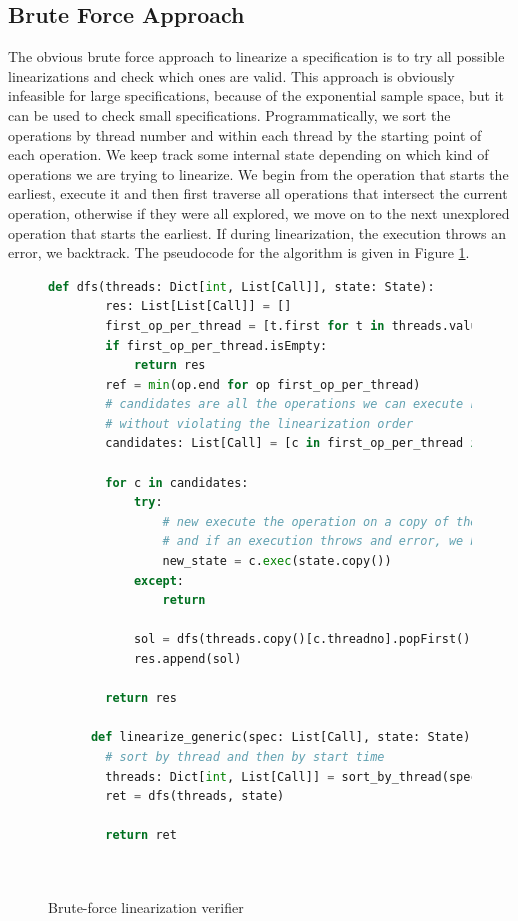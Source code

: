 \documentclass[oneside, a4paper, onecolumn, 10pt]{article}
\begin{document}
\subsection{Brute Force Approach}
The obvious brute force approach to linearize a specification is to try all possible linearizations and check which ones are valid. This approach is obviously infeasible for large specifications, because of the exponential sample space, but it can be used to check small specifications. Programmatically, we sort the operations by thread number and within each thread by the starting point of each operation. We keep track some internal state depending on which kind of operations we are trying to linearize. We begin from the operation that starts the earliest, execute it and then first traverse all operations that intersect the current operation, otherwise if they were all explored, we move on to the next unexplored operation that starts the earliest. If during linearization, the execution throws an error, we backtrack. The pseudocode for the algorithm is given in Figure \ref{Brute-force Linearization Verifier}. 

\begin{figure}
  \begin{center}
    \begin{lstlisting}[language=Python]
      def dfs(threads: Dict[int, List[Call]], state: State):
        res: List[List[Call]] = []
        first_op_per_thread = [t.first for t in threads.values()]
        if first_op_per_thread.isEmpty:
            return res
        ref = min(op.end for op first_op_per_thread)
        # candidates are all the operations we can execute next
        # without violating the linearization order
        candidates: List[Call] = [c in first_op_per_thread if c.intersects(ref)]
      
        for c in candidates:
            try:
                # new execute the operation on a copy of the state
                # and if an execution throws and error, we backtrack
                new_state = c.exec(state.copy())
            except:
                return
      
            sol = dfs(threads.copy()[c.threadno].popFirst(), new_state)
            res.append(sol)
      
        return res
      
      def linearize_generic(spec: List[Call], state: State):
        # sort by thread and then by start time
        threads: Dict[int, List[Call]] = sort_by_thread(spec)
        ret = dfs(threads, state)
      
        return ret
      
          
        \end{lstlisting}
  \end{center}
  \caption{\label{Brute-force Linearization Verifier}Brute-force linearization verifier}
\end{figure}
\end{document}
